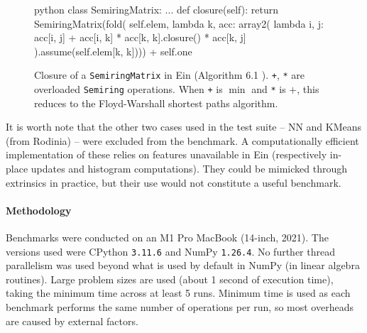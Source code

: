 \begin{figure}
    \centering
\begin{cminted}{python}
class SemiringMatrix:
    ...
    def closure(self):
        return SemiringMatrix(fold(
            self.elem,
            lambda k, acc: array2(
                lambda i, j: acc[i, j] + acc[i, k] * acc[k, k].closure() * acc[k, j]
        ).assume(self.elem[k, k]))) + self.one
\end{cminted}
    \caption{Closure of a \texttt{SemiringMatrix} in Ein (Algorithm 6.1 \cite{abdali1985transitive}). \texttt{+}, \texttt{*} are overloaded \texttt{Semiring} operations. When \texttt{+} is $\min$ and \texttt{*} is $+$, this reduces to the Floyd-Warshall shortest paths algorithm.}
    \label{fig:semirings}
\end{figure}

It is worth note that the other two cases used in the test suite -- NN and KMeans (from Rodinia) -- were excluded from the benchmark. A computationally efficient implementation of these relies on features unavailable in Ein (respectively in-place updates and histogram computations). They could be mimicked through extrinsics in practice, but their use would not constitute a useful benchmark.

\paragraph{Methodology} Benchmarks were conducted on an M1 Pro MacBook (14-inch, 2021). The versions used were CPython \texttt{3.11.6} and NumPy \texttt{1.26.4}. No further thread parallelism was used beyond what is used by default in NumPy (in linear algebra routines). Large problem sizes are used (about 1 second of execution time), taking the minimum time across at least 5 runs. Minimum time is used as each benchmark performs the same number of operations per run, so most overheads are caused by external factors.

